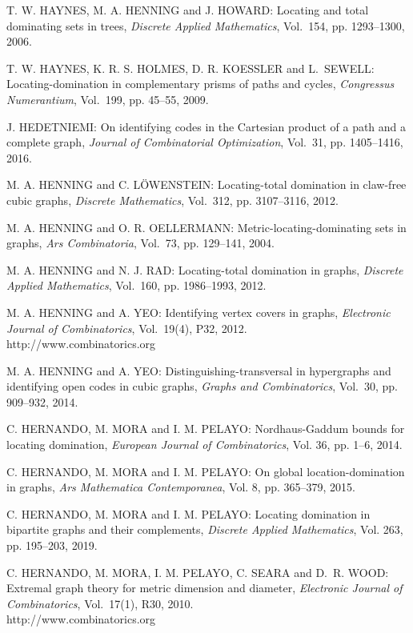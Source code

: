 \begin{thebibliography}{999}
T. W. HAYNES, M. A. HENNING and J. HOWARD: Locating and total dominating sets in trees, {\it Discrete Applied Mathematics}, Vol.~154, pp. 1293--1300, 2006.

T. W. HAYNES, K. R. S. HOLMES, D. R. KOESSLER and L.~SEWELL: Locating-domination in complementary prisms of paths and cycles, %
{\it Congressus Numerantium}, Vol.~199, pp. 45--55, 2009.

J. HEDETNIEMI: On identifying codes in the Cartesian product of a path and a complete graph, {\it Journal of Combinatorial Optimization}, Vol.~31, pp. 1405--1416, 2016.

M. A. HENNING and C. L\"{O}WENSTEIN: Locating-total domination in claw-free cubic graphs, {\it Discrete Mathematics}, Vol.~312, pp. 3107--3116, 2012. 

M. A. HENNING and O. R. OELLERMANN: Metric-locating-dominating sets in graphs, {\it Ars Combinatoria}, Vol.~73, pp. 129--141, 2004.

M. A. HENNING and N. J. RAD: Locating-total domination in graphs, {\it Discrete Applied Mathematics}, Vol.~160, pp. 1986--1993, 2012.

M. A. HENNING and A. YEO: Identifying vertex covers in graphs, {\it Electronic Journal of Combinatorics}, Vol.~19(4), P32, 2012.\\
http://www.combinatorics.org

M. A. HENNING and A. YEO: Distinguishing-transversal in hypergraphs and identifying open codes in cubic graphs, {\it Graphs and Combinatorics}, Vol.~30, pp. 909--932, 2014.

C. HERNANDO, M. MORA and I. M. PELAYO: Nordhaus-Gaddum bounds for locating domination, {\it European Journal of Combinatorics}, Vol. 36, pp. 1--6, 2014. 

C. HERNANDO, M. MORA and I. M. PELAYO: On global location-domination in graphs, {\it Ars Mathematica Contemporanea}, Vol. 8, pp. 365--379, 2015.

C. HERNANDO, M. MORA and I. M. PELAYO: Locating domination in bipartite graphs and their complements, {\it Discrete Applied Mathematics}, Vol. 263, pp. 195--203, 2019.

C. HERNANDO, M. MORA, I. M. PELAYO, C. SEARA and D.~R. WOOD: Extremal graph theory for metric dimension and diameter, {\it Electronic Journal of Combinatorics}, Vol.~17(1), R30, 2010.\\
http://www.combinatorics.org


\end{thebibliography}
